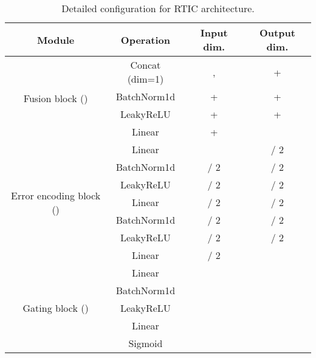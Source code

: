 \documentclass[10pt,twocolumn,letterpaper]{article}
\begin{document}
\begin{table}[H]
    \caption{Detailed configuration for RTIC architecture.}
    \centering
    \begin{adjustbox}{width=0.45\textwidth}
    \begin{tabular}{cccc}
        \toprule
        Module & Operation & Input dim.     & Output dim.    \\
        \hline \hline
        \multirow{4}{*}{Fusion block ()}         & Concat (dim=1) & ,   &  +  \\
                                                              & BatchNorm1d    &  +  &  +  \\
                                                              & LeakyReLU      &  +  &  +  \\
                                                              & Linear         &  +  &          \\
        \hline \hline
        \multirow{7}{*}{Error encoding block ()} & Linear         &          &  / 2     \\
                                                              & BatchNorm1d    &  / 2     &  / 2     \\
                                                              & LeakyReLU      &  / 2     &  / 2     \\
                                                              & Linear         &  / 2     &  / 2     \\
                                                              & BatchNorm1d    &  / 2     &  / 2     \\
                                                              & LeakyReLU      &  / 2     &  / 2     \\
                                                              & Linear         &  / 2     &          \\
        \hline \hline
        \multirow{5}{*}{Gating block ()}         & Linear         &          &          \\
                                                              & BatchNorm1d    &          &          \\
                                                              & LeakyReLU      &          &          \\
                                                              & Linear         &          &          \\
                                                              & Sigmoid        &          &          \\
        \bottomrule
    \end{tabular}
    \end{adjustbox}
    \label{tab:rtic_detail}
\end{table}
\end{document}
